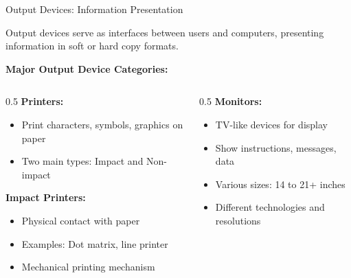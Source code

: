 \documentclass[aspectratio=169]{beamer}
\begin{document}
\begin{frame}{Output Devices: Information Presentation}
    \begin{definition}
        Output devices serve as interfaces between users and computers, presenting information in soft or hard copy formats.
    \end{definition}
    
    \vspace{0.3cm}
    \textbf{Major Output Device Categories:}
    
    \begin{columns}
        \begin{column}{0.5\textwidth}
            \textbf{Printers:}
            \begin{itemize}
                \item Print characters, symbols, graphics on paper
                \item Two main types: Impact and Non-impact
            \end{itemize}
             
            \textbf{Impact Printers:}
            \begin{itemize}
                \item Physical contact with paper
                \item Examples: Dot matrix, line printer
                \item Mechanical printing mechanism
            \end{itemize}
             
        \end{column}
        \begin{column}{0.5\textwidth} 
            \textbf{Monitors:}
            \begin{itemize}
                \item TV-like devices for display
                \item Show instructions, messages, data
                \item Various sizes: 14 to 21+ inches
                \item Different technologies and resolutions
            \end{itemize}
        \end{column}
    \end{columns}
\end{frame}
\end{document}
